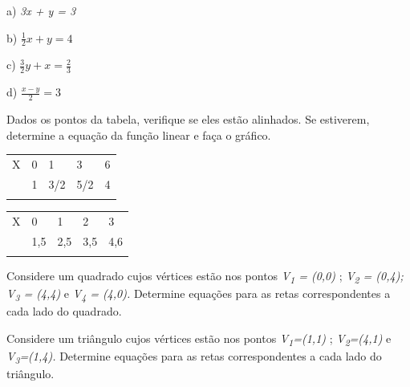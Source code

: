 \begin{exercicios}
\begin{multicols}{2}
a) \textit{3x + y = 3}

b)  \( \frac{1}{2}x+y=4 \)

c)  \( \frac{3}{2}y+x=\frac{2}{3} \)

d)  \( \frac{x-y}{2}=3 \)
\end{multicols}

\exitem{} Dados os pontos da tabela, verifique se eles estão alinhados. Se estiverem, determine a equação da função linear e faça o gráfico.

\begin{multicols}{2}
\begin{table}[h]
\begin{tabular}{p{0.2in}p{0.18in}p{0.19in}p{0.16in}p{0.1in}}
\hline
\multicolumn{1}{|p{0.2in}}{X} & 
\multicolumn{1}{|p{0.18in}}{0} & 
\multicolumn{1}{|p{0.19in}}{1} & 
\multicolumn{1}{|p{0.16in}}{3} & 
\multicolumn{1}{|p{0.1in}|}{6} \\
\hhline{-----}
\multicolumn{1}{|p{0.2in}}{Y} & 
\multicolumn{1}{|p{0.18in}}{1} & 
\multicolumn{1}{|p{0.19in}}{3/2} & 
\multicolumn{1}{|p{0.16in}}{5/2} & 
\multicolumn{1}{|p{0.1in}|}{4} \\
\hhline{-----}
\end{tabular}
 \end{table}

\begin{table}[h]
\begin{tabular}{p{0.2in}p{0.18in}p{0.19in}p{0.16in}p{0.16in}}
\hline
\multicolumn{1}{|p{0.2in}}{X} & 
\multicolumn{1}{|p{0.18in}}{0} & 
\multicolumn{1}{|p{0.19in}}{1} & 
\multicolumn{1}{|p{0.16in}}{2} & 
\multicolumn{1}{|p{0.16in}|}{3} \\
\hhline{-----}
\multicolumn{1}{|p{0.2in}}{Y} & 
\multicolumn{1}{|p{0.18in}}{1,5} & 
\multicolumn{1}{|p{0.19in}}{2,5} & 
\multicolumn{1}{|p{0.16in}}{3,5} & 
\multicolumn{1}{|p{0.16in}|}{4,6} \\
\hhline{-----}
\end{tabular}
 \end{table}
\end{multicols}

\exitem{} Considere um quadrado cujos vértices estão nos pontos \textit{V\textsubscript{1} = (0,0)} ;   \textit{V\textsubscript{2} = (0,4);  V\textsubscript{3} = (4,4)}  e  \textit{V\textsubscript{4} = (4,0). }Determine equações para as retas correspondentes a cada lado do quadrado.

\exitem{} Considere um triângulo cujos vértices estão nos pontos \textit{V\textsubscript{1}=(1,1)} ; \textit{V\textsubscript{2}=(4,1) }e\textit{ V\textsubscript{3}=(1,4). }Determine equações para as retas correspondentes a cada lado do triângulo.


\end{exercicios}
